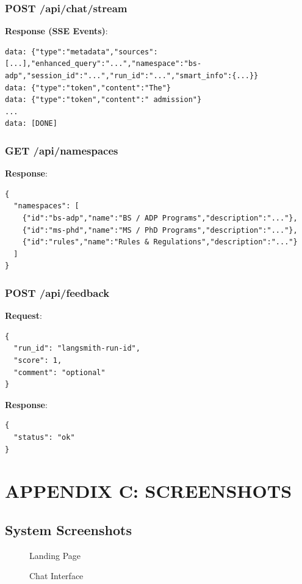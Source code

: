 \documentclass[12pt,a4paper]{book}
\numberwithin{table}{chapter}
\numberwithin{figure}{chapter}
\numberwithin{equation}{chapter}
\begin{document}
\subsection{POST /api/chat/stream}
\textbf{Response (SSE Events)}:
\begin{lstlisting}
data: {"type":"metadata","sources":[...],"enhanced_query":"...","namespace":"bs-adp","session_id":"...","run_id":"...","smart_info":{...}}
data: {"type":"token","content":"The"}
data: {"type":"token","content":" admission"}
...
data: [DONE]
\end{lstlisting}

\subsection{GET /api/namespaces}
\textbf{Response}:
\begin{lstlisting}
{
  "namespaces": [
    {"id":"bs-adp","name":"BS / ADP Programs","description":"..."},
    {"id":"ms-phd","name":"MS / PhD Programs","description":"..."},
    {"id":"rules","name":"Rules & Regulations","description":"..."}
  ]
}
\end{lstlisting}

\subsection{POST /api/feedback}
\textbf{Request}:
\begin{lstlisting}
{
  "run_id": "langsmith-run-id",
  "score": 1,
  "comment": "optional"
}
\end{lstlisting}

\textbf{Response}:
\begin{lstlisting}
{
  "status": "ok"
}
\end{lstlisting}

\chapter{APPENDIX C: SCREENSHOTS}

\section{System Screenshots}

\begin{figure}[h]
\caption{Landing Page}
\end{figure}

\begin{figure}[h]
\caption{Chat Interface}
\end{figure}
\end{document}
